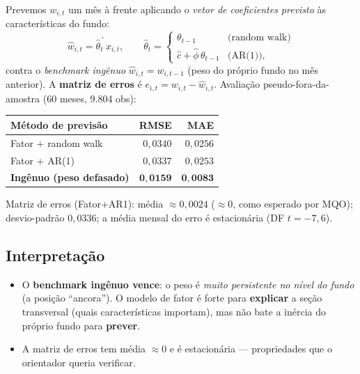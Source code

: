 \documentclass[11pt]{article}
\begin{document}
Prevemos $w_{i,t}$ um mês à frente aplicando o \emph{vetor de coeficientes previsto}
às características do fundo:
\begin{equation}
\widehat{w}_{i,t} = \widehat{\theta}_t^{\,\prime}\, x_{i,t}, \qquad
\widehat{\theta}_t =
\begin{cases}
\theta_{t-1} & \text{(random walk)}\\[2pt]
\widehat{c}+\widehat{\phi}\,\theta_{t-1} & \text{(AR(1))},
\end{cases}
\label{eq:fc}
\end{equation}
contra o \emph{benchmark ingênuo} $\widehat{w}_{i,t} = w_{i,t-1}$ (peso do próprio
fundo no mês anterior). A \textbf{matriz de erros} é $e_{i,t} = w_{i,t} -
\widehat{w}_{i,t}$. Avaliação pseudo-fora-da-amostra (60 meses, 9.804 obs):

\begin{table}[h]\centering
\begin{tabular}{@{}lrr@{}}
\toprule
\textbf{Método de previsão} & \textbf{RMSE} & \textbf{MAE} \\
\midrule
Fator + random walk         & $0{,}0340$ & $0{,}0256$ \\
Fator + AR(1)               & $0{,}0337$ & $0{,}0253$ \\
\textbf{Ingênuo (peso defasado)} & $\mathbf{0{,}0159}$ & $\mathbf{0{,}0083}$ \\
\bottomrule
\end{tabular}
\end{table}
\noindent\footnotesize Matriz de erros (Fator+AR1): média $\approx 0{,}0024$
($\approx 0$, como esperado por MQO); desvio-padrão $0{,}0336$; a média mensal do erro
é estacionária (DF $t=-7{,}6$). \normalsize

\subsection*{Interpretação}
\begin{itemize}
\item O \textbf{benchmark ingênuo vence}: o peso é \emph{muito persistente no nível do
fundo} (a posição ``ancora''). O modelo de fator é forte para \textbf{explicar} a
seção transversal (quais características importam), mas não bate a inércia do próprio
fundo para \textbf{prever}.
\item A matriz de erros tem média $\approx 0$ e é estacionária — propriedades que o
orientador queria verificar.
\end{itemize}
\end{document}
